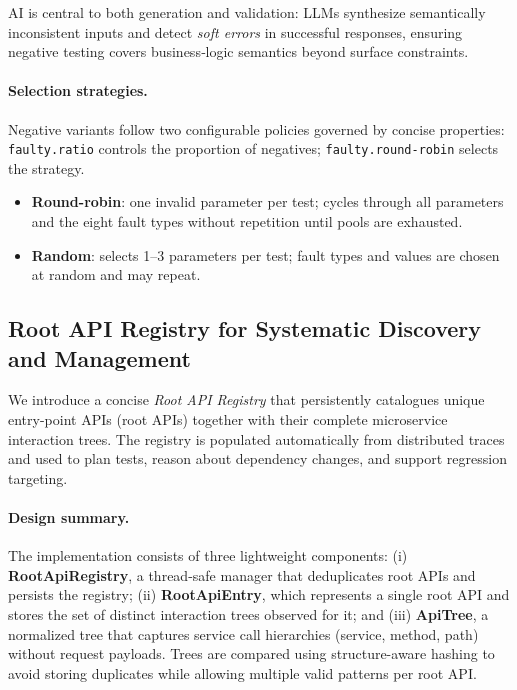 \documentclass[conference]{IEEEtran}
\begin{document}
AI is central to both generation and validation: LLMs synthesize semantically inconsistent inputs and detect \emph{soft errors} in successful responses, ensuring negative testing covers business‑logic semantics beyond surface constraints.

\paragraph{Selection strategies.}
Negative variants follow two configurable policies governed by concise properties: \texttt{faulty.ratio} controls the proportion of negatives; \texttt{faulty.round-robin} selects the strategy.
\begin{itemize}[leftmargin=*]
  \item \textbf{Round-robin}: one invalid parameter per test; cycles through all parameters and the eight fault types without repetition until pools are exhausted.
  \item \textbf{Random}: selects 1--3 parameters per test; fault types and values are chosen at random and may repeat.
\end{itemize}

\subsection{Root API Registry for Systematic Discovery and Management}\label{ssec:registry}

We introduce a concise \emph{Root API Registry} that persistently catalogues unique entry-point APIs (root APIs) together with their complete microservice interaction trees. The registry is populated automatically from distributed traces and used to plan tests, reason about dependency changes, and support regression targeting.

\paragraph{Design summary.}
The implementation consists of three lightweight components: (i) \textbf{RootApiRegistry}, a thread-safe manager that deduplicates root APIs and persists the registry; (ii) \textbf{RootApiEntry}, which represents a single root API and stores the set of distinct interaction trees observed for it; and (iii) \textbf{ApiTree}, a normalized tree that captures service call hierarchies (service, method, path) without request payloads. Trees are compared using structure-aware hashing to avoid storing duplicates while allowing multiple valid patterns per root API.
\end{document}
